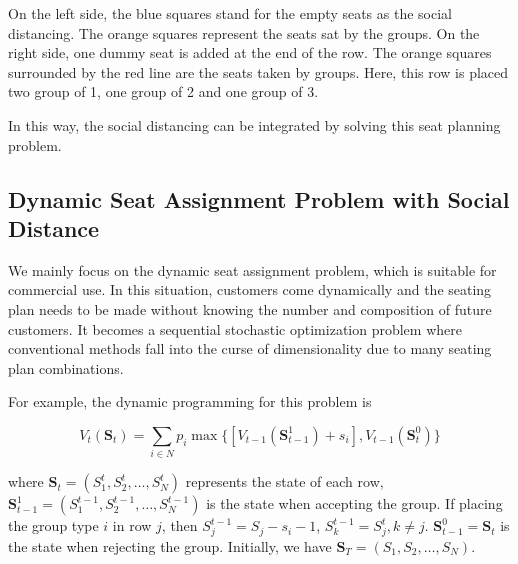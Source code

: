 On the left side, the blue squares stand for the empty seats as the social distancing. The orange squares represent the seats sat by the groups. 
On the right side, one dummy seat is added at the end of the row. The orange squares surrounded by the red line are the seats taken by groups. Here, this row is placed two group of 1, one group of 2 and one group of 3.

In this way, the social distancing can be integrated by solving this seat planning problem.








\subsection{Dynamic Seat Assignment Problem with Social Distance}\label{dynamic_demand}

We mainly focus on the dynamic seat assignment problem, which is suitable for commercial use. In this situation, customers come dynamically and the seating plan needs to be made without knowing the number and composition of future customers. It becomes a sequential stochastic optimization problem where conventional methods fall into the curse of dimensionality due to many seating plan combinations. 

For example, the dynamic programming for this problem is


$$V_{t}(\mathbf{S}_{t}) = \sum_{i \in N} p_i \max\{ {[V_{t-1}(\mathbf{S}_{t-1}^{1})+ s_i]}, {V_{t-1}(\mathbf{S}_{t}^{0})}\}$$

where $\mathbf{S}_{t} = (S_1^{t}, S_2^{t}, \ldots, S_{N}^{t})$ represents the state of each row, $\mathbf{S}_{t-1}^{1} = (S_1^{t-1}, S_2^{t-1}, \ldots, S_{N}^{t-1})$ is the state when accepting the group. If placing the group type $i$ in row $j$, then $S_{j}^{t-1} = S_{j}-s_{i}-1$, $S_{k}^{t-1} = S_{j}^{t}, k \neq j$. $\mathbf{S}_{t-1}^{0} = \mathbf{S}_{t}$ is the state when rejecting the group. Initially, we have $\mathbf{S}_{T} = (S_1, S_2, \ldots, S_{N})$.

